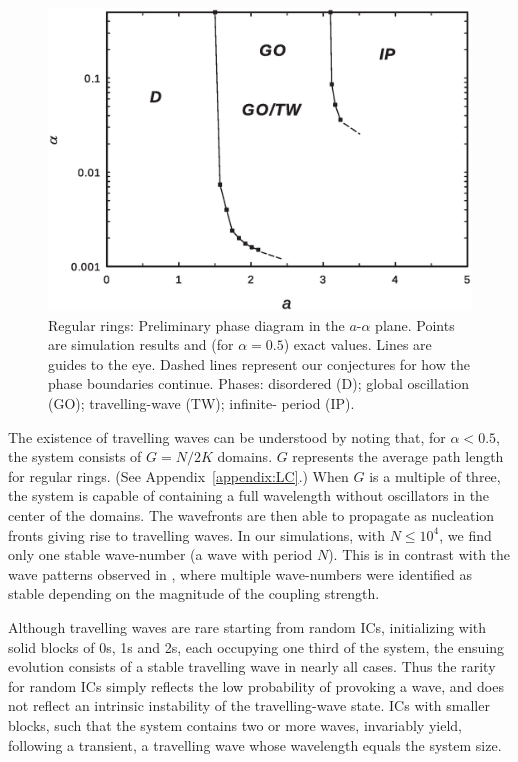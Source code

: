 \begin{figure}[b]
\begin{center}
    \includegraphics[width=1.\textwidth]{fig/phasediag.eps}
\caption{\label{fig:phase_diagram} Regular rings: Preliminary phase diagram in the $a$-$\alpha$ plane.  Points are simulation results
and (for $\alpha=0.5$) exact values.  Lines are guides to the eye.  Dashed lines represent our conjectures for how the phase boundaries
continue.  Phases: disordered (D); global oscillation (GO); travelling-wave (TW); infinite- period (IP).}
\end{center}
\end{figure}

The existence of travelling waves can be understood by noting that, for $\alpha<0.5$, the system consists of $G=N/2K$ domains. $G$
represents the average path length for regular rings. (See Appendix~\ref{appendix:LC}.) When $G$ is a multiple of three, the system is
capable of containing a full wavelength without oscillators in the center of the domains. The wavefronts are then able to propagate as
nucleation fronts \cite{assis2011infinite} giving rise to travelling waves. In our simulations, with $N \leq10^4$, we find only one
stable wave-number (a wave with period $N$). This is in contrast with the wave patterns observed in \cite{escaff2014arrays}, where
multiple wave-numbers were identified as stable depending on the magnitude of the coupling strength.

Although travelling waves are rare starting from random ICs, initializing with solid blocks of 0s, 1s and 2s, each occupying one third
of the system, the ensuing evolution consists of a stable travelling wave in nearly all cases.  Thus the rarity for random ICs simply
reflects the low probability of provoking a wave, and does not reflect an intrinsic instability of the travelling-wave state.  ICs with
smaller blocks, such that the system contains two or more waves, invariably yield, following a transient, a travelling wave whose
wavelength equals the system size.


